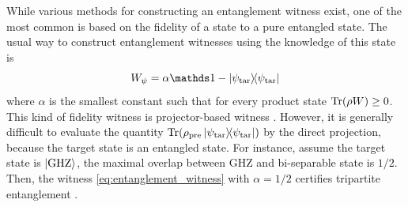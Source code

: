\documentclass[
reprint,
aps,
pra,
floatfix,
]{revtex4-2}
\theoremstyle{plain}
\theoremstyle{definition}
\newtheorem{definition}{Definition}
\newcommand{\ew}{W}
\newcommand{\ob}{O}
\newcommand{\dm}{\rho}
\newcommand{\ghz}{\text{GHZ}}
\newcommand{\bi}{\text{bi}}
\newcommand{\target}{\textup{tar}}
\newcommand{\prepare}{\textup{pre}}
\begin{document}



While various methods for constructing an entanglement witness exist, one of the most common is based on the fidelity of a state to a pure entangled state.
The usual way to construct entanglement witnesses using the knowledge of this state is
\begin{equation}
	\ew_{\psi} = \alpha\identity - \op{\psi_\target} 
	\label{eq:entanglement_witness}
\end{equation}
where $\alpha$ is the smallest constant such that for every product state $\Tr(\dm\ew)\ge 0$.
This kind of fidelity witness is projector-based witness \cite{bourennaneWitnessingMultipartiteEntanglement2004}.
However, it is generally difficult to evaluate the quantity $\Tr(\dm_{\prepare} \op{\psi_{\target}})$ by the direct projection, because the target state is an entangled state.
For instance, assume the target state is $\ket{\ghz}$,
the maximal overlap between GHZ and bi-separable state is $1/2$.
Then, the witness \cref{eq:entanglement_witness} with $\alpha=1/2$ certifies tripartite entanglement 
\cite{acinClassificationMixedThreequbit2001}.
\end{document}
